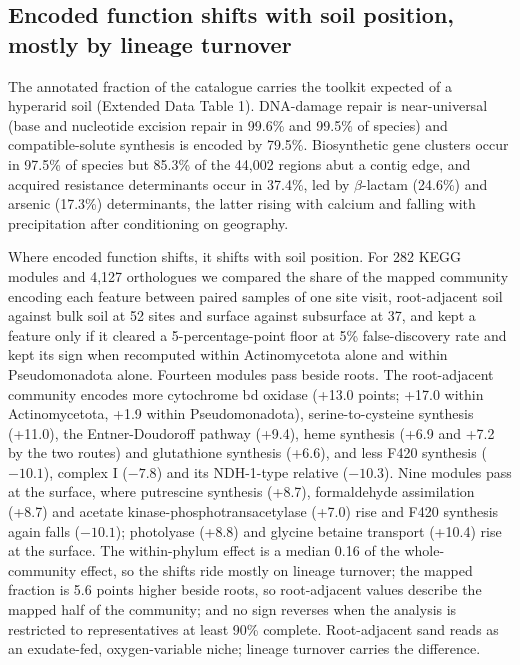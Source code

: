\documentclass[11pt]{article}
\begin{document}
\subsection*{Encoded function shifts with soil position, mostly by lineage turnover}

The annotated fraction of the catalogue carries the toolkit expected of a hyperarid soil (Extended
Data Table 1).
DNA-damage repair
is near-universal (base and nucleotide excision repair in 99.6\% and 99.5\% of species) and
compatible-solute synthesis is encoded by 79.5\%. Biosynthetic gene clusters occur in 97.5\% of
species but 85.3\% of the 44{,}002 regions abut a contig edge, and acquired resistance determinants
occur in 37.4\%, led by $\beta$-lactam (24.6\%) and arsenic (17.3\%) determinants, the latter rising
with calcium and falling with precipitation after conditioning on geography.

Where encoded function shifts, it shifts with soil position. For 282 KEGG modules and 4{,}127
orthologues we compared the share of the mapped community encoding each feature between paired
samples of one site visit, root-adjacent soil against bulk soil at 52 sites and surface against
subsurface at 37, and kept a feature only if it cleared a 5-percentage-point floor at 5\%
false-discovery rate and kept its sign when recomputed within Actinomycetota alone and within
Pseudomonadota alone. Fourteen modules pass beside roots. The root-adjacent community encodes more
cytochrome bd oxidase (+13.0 points; +17.0 within Actinomycetota, +1.9 within Pseudomonadota),
serine-to-cysteine synthesis (+11.0), the Entner-Doudoroff pathway (+9.4), heme synthesis (+6.9 and
+7.2 by the two routes) and glutathione synthesis (+6.6), and less F420 synthesis ($-10.1$), complex I
($-7.8$) and its NDH-1-type relative ($-10.3$).
Nine modules pass at
the surface, where putrescine synthesis (+8.7), formaldehyde assimilation (+8.7) and acetate
kinase-phosphotransacetylase (+7.0) rise and F420 synthesis again falls ($-10.1$); photolyase
(+8.8) and glycine betaine transport (+10.4) rise at the surface. The within-phylum effect is a
median 0.16 of the whole-community effect, so the shifts ride mostly on lineage turnover; the mapped
fraction is 5.6 points higher beside roots, so root-adjacent values describe the mapped half of the
community; and no sign reverses when the analysis is restricted to representatives at least 90\%
complete. Root-adjacent sand reads as an exudate-fed, oxygen-variable niche; lineage turnover carries
the difference.
\end{document}
